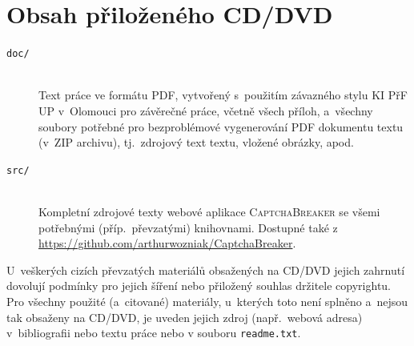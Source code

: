 \documentclass[
  field=ainfp,
  master=true,
  biblatex,
  sourcecodes=false,
  theorems=false,
  glossaries,
  index
]{kidiplom}
\begin{document}
\appendix

\section{Obsah přiloženého CD/DVD} \label{sec:ObsahCD}

\begin{description}

\item[\texttt{doc/}] \hfill \\
  Text práce ve formátu PDF, vytvořený s~použitím závazného stylu KI
  PřF UP v~Olomouci pro závěrečné práce, včetně všech příloh,
  a~všechny soubory potřebné pro bezproblémové vygenerování PDF
  dokumentu textu (v~ZIP archivu), tj.~zdrojový text textu, vložené
  obrázky, apod.

\item[\texttt{src/}] \hfill \\
  Kompletní zdrojové texty webové aplikace \textsc{CaptchaBreaker} se všemi potřebnými (příp.~převzatými) knihovnami. Dostupné také z \url{https://github.com/arthurwozniak/CaptchaBreaker}.

\end{description}

U~veškerých cizích převzatých materiálů obsažených na CD/DVD jejich
zahr\-nutí dovolují podmínky pro jejich šíření nebo přiložený souhlas
držitele copyrightu. Pro všechny použité (a~citované) materiály,
u~kterých toto není splněno a~nejsou tak obsaženy na CD/DVD, je uveden
jejich zdroj (např.~webová adresa) v~bibliografii nebo textu práce
nebo v souboru \texttt{readme.txt}.


\printglossary


\nocite{*}
\printbibliography
\end{document}
